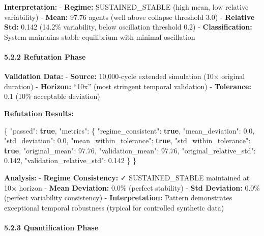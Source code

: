 \documentclass[
]{article}
\newenvironment{Shaded}{}{}
\newcommand{\DataTypeTok}[1]{\textcolor[rgb]{0.56,0.13,0.00}{#1}}
\newcommand{\FloatTok}[1]{\textcolor[rgb]{0.25,0.63,0.44}{#1}}
\newcommand{\FunctionTok}[1]{\textcolor[rgb]{0.02,0.16,0.49}{#1}}
\newcommand{\KeywordTok}[1]{\textcolor[rgb]{0.00,0.44,0.13}{\textbf{#1}}}
\begin{document}
\textbf{Interpretation:} - \textbf{Regime:} SUSTAINED\_STABLE (high
mean, low relative variability) - \textbf{Mean:} 97.76 agents (well
above collapse threshold 3.0) - \textbf{Relative Std:} 0.142 (14.2\%
variability, below oscillation threshold 0.2) - \textbf{Classification:}
System maintains stable equilibrium with minimal oscillation

\paragraph{5.2.2 Refutation Phase}\label{refutation-phase}

\textbf{Validation Data:} - \textbf{Source:} 10,000-cycle extended
simulation (10× original duration) - \textbf{Horizon:} ``10x'' (most
stringent temporal validation) - \textbf{Tolerance:} 0.1 (10\%
acceptable deviation)

\textbf{Refutation Results:}

\begin{Shaded}
\begin{Highlighting}[]
\FunctionTok{\{}
  \DataTypeTok{"passed"}\FunctionTok{:} \KeywordTok{true}\FunctionTok{,}
  \DataTypeTok{"metrics"}\FunctionTok{:} \FunctionTok{\{}
    \DataTypeTok{"regime\_consistent"}\FunctionTok{:} \KeywordTok{true}\FunctionTok{,}
    \DataTypeTok{"mean\_deviation"}\FunctionTok{:} \FloatTok{0.0}\FunctionTok{,}
    \DataTypeTok{"std\_deviation"}\FunctionTok{:} \FloatTok{0.0}\FunctionTok{,}
    \DataTypeTok{"mean\_within\_tolerance"}\FunctionTok{:} \KeywordTok{true}\FunctionTok{,}
    \DataTypeTok{"std\_within\_tolerance"}\FunctionTok{:} \KeywordTok{true}\FunctionTok{,}
    \DataTypeTok{"original\_mean"}\FunctionTok{:} \FloatTok{97.76}\FunctionTok{,}
    \DataTypeTok{"validation\_mean"}\FunctionTok{:} \FloatTok{97.76}\FunctionTok{,}
    \DataTypeTok{"original\_relative\_std"}\FunctionTok{:} \FloatTok{0.142}\FunctionTok{,}
    \DataTypeTok{"validation\_relative\_std"}\FunctionTok{:} \FloatTok{0.142}
  \FunctionTok{\}}
\FunctionTok{\}}
\end{Highlighting}
\end{Shaded}

\textbf{Analysis:} - \textbf{Regime Consistency:} ✓ SUSTAINED\_STABLE
maintained at 10× horizon - \textbf{Mean Deviation:} 0.0\% (perfect
stability) - \textbf{Std Deviation:} 0.0\% (perfect variability
consistency) - \textbf{Interpretation:} Pattern demonstrates exceptional
temporal robustness (typical for controlled synthetic data)

\paragraph{5.2.3 Quantification Phase}\label{quantification-phase}
\end{document}
